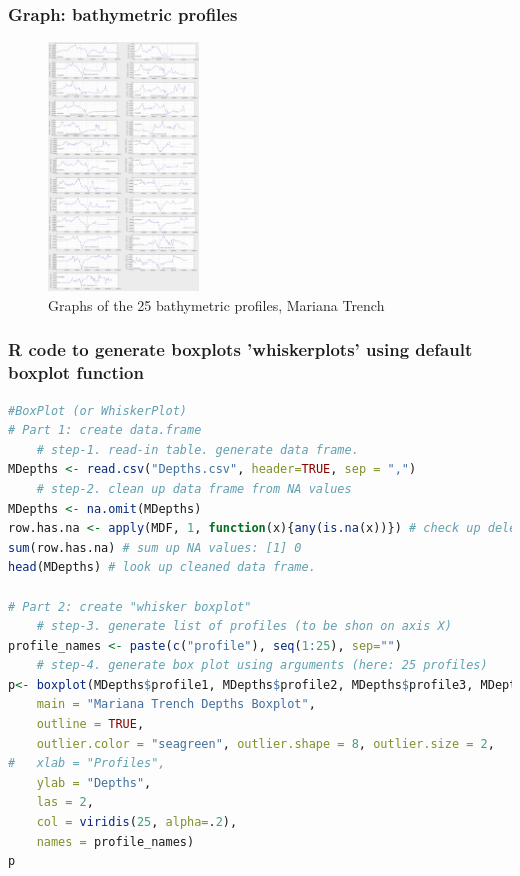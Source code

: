 \documentclass[pdflatex,compress,10pt,
	xcolor={dvipsnames,dvipsnames,svgnames,x11names,table},
	hyperref={colorlinks = true,breaklinks = true, urlcolor = NavyBlue, breaklinks = true}]{beamer}
\begin{document}
\begin{frame}\frametitle{Graph: bathymetric profiles}
\begin{figure}[H]
	\centering
		\includegraphics[width=4cm]{Fig-2-5.jpg}
	\caption{Graphs of the 25 bathymetric profiles, Mariana Trench}\label{fig:2-5}
\end{figure}		
\end{frame}


\begin{frame}[fragile]\frametitle{R code to generate boxplots 'whiskerplots' using default boxplot function}
\begin{lstlisting}[language=R]
#BoxPlot (or WhiskerPlot)
# Part 1: create data.frame
	# step-1. read-in table. generate data frame.
MDepths <- read.csv("Depths.csv", header=TRUE, sep = ",")
	# step-2. clean up data frame from NA values
MDepths <- na.omit(MDepths) 
row.has.na <- apply(MDF, 1, function(x){any(is.na(x))}) # check up deleted NA
sum(row.has.na) # sum up NA values: [1] 0
head(MDepths) # look up cleaned data frame.

# Part 2: create "whisker boxplot"
	# step-3. generate list of profiles (to be shon on axis X)
profile_names <- paste(c("profile"), seq(1:25), sep="") 
	# step-4. generate box plot using arguments (here: 25 profiles)
p<- boxplot(MDepths$profile1, MDepths$profile2, MDepths$profile3, MDepths$profile4, MDepths$profile5, MDepths$profile6,MDepths$profile7, MDepths$profile8, MDepths$profile9, MDepths$profile10, MDepths$profile11, MDepths$profile12, MDepths$profile13, MDepths$profile14, MDepths$profile15, MDepths$profile16, MDepths$profile17, MDepths$profile18, MDepths$profile19, MDepths$profile20, MDepths$profile21, MDepths$profile22, MDepths$profile23, MDepths$profile24, MDepths$profile25,     
	main = "Mariana Trench Depths Boxplot", 
	outline = TRUE,
	outlier.color = "seagreen", outlier.shape = 8, outlier.size = 2,    
#	xlab = "Profiles",         
	ylab = "Depths",         
	las = 2,         
	col = viridis(25, alpha=.2),         
	names = profile_names)
p
\end{lstlisting}
\end{frame}
\end{document}
